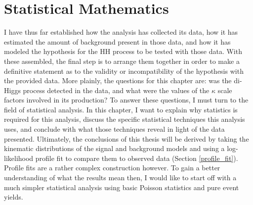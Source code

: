 %


\section{Statistical Mathematics}

    I have thus far established how the analysis has collected its data,
        how it has estimated the amount of background present in those data,
        and how it has modeled the hypothesis for the HH process to be tested with those data.
    With these assembled, the final step is to arrange them together in order to make a definitive statement
        as to the validity or incompatibility of the hypothesis with the provided data.
    More plainly, the questions for this chapter are:
        was the di-Higgs process detected in the data,
        and what were the values of the $\kappa$ scale factors involved in its production?
    To answer these questions, I must turn to the field of statistical analysis.
    In this chapter, I want to explain why statistics is required for this analysis,
        discuss the specific statistical techniques this analysis uses,
        and conclude with what those techniques reveal in light of the data presented.
    Ultimately, the conclusions of this thesis will be derived by
        taking the kinematic distributions of the signal and background models and 
        using a log-likelihood profile fit to compare them to observed data (Section \ref{profile_fit}).
    Profile fits are a rather complex construction however.
    To gain a better understanding of what the results mean then,
        I would like to start off with a much simpler statistical analysis
        using basic Poisson statistics and pure event yields.

